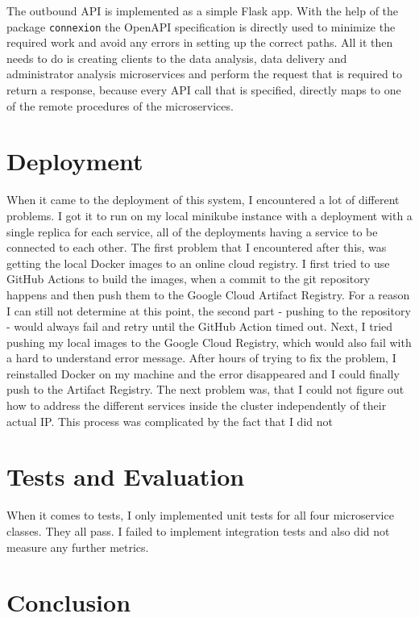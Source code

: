 \documentclass[11pt]{article}
\begin{document}
	The outbound API is implemented as a simple Flask app. With the help of the package \texttt{connexion} the OpenAPI specification is directly used to minimize the required work and avoid any errors in setting up the correct paths. All it then needs to do is creating clients to the data analysis, data delivery and administrator analysis microservices and perform the request that is required to return a response, because every API call that is specified, directly maps to one of the remote procedures of the microservices.
	
	\section{Deployment}
	
	When it came to the deployment of this system, I encountered a lot of different problems. I got it to run on my local minikube instance with a deployment with a single replica for each service, all of the deployments having a service to be connected to each other. The first problem that I encountered after this, was getting the local Docker images to an online cloud registry. I first tried to use GitHub Actions to build the images, when a commit to the git repository happens and then push them to the Google Cloud Artifact Registry. For a reason I can still not determine at this point, the second part - pushing to the repository - would always fail and retry until the GitHub Action timed out. Next, I tried pushing my local images to the Google Cloud Registry, which would also fail with a hard to understand error message. After hours of trying to fix the problem, I reinstalled Docker on my machine and the error disappeared and I could finally push to the Artifact Registry. The next problem was, that I could not figure out how to address the different services inside the cluster independently of their actual IP. This process was complicated by the fact that I did not 
	
	\section{Tests and Evaluation}
	
	When it comes to tests, I only implemented unit tests for all four microservice classes. They all pass. I failed to implement integration tests and also did not measure any further metrics.
	
	\section{Conclusion}
	
\end{document}
